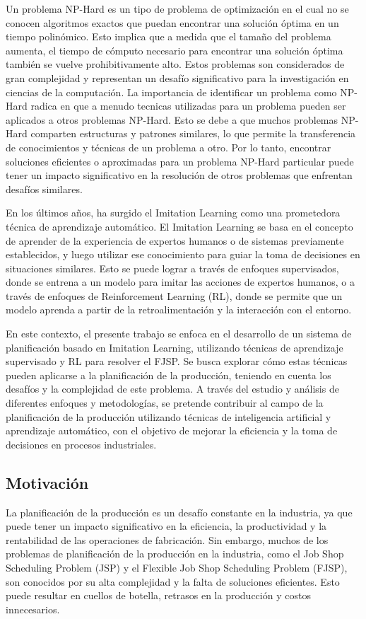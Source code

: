 Un problema NP-Hard es un tipo de problema de optimización en el cual no se conocen algoritmos 
exactos que puedan encontrar una solución óptima en un tiempo polinómico. Esto implica que a 
medida que el tamaño del problema aumenta, el tiempo de cómputo necesario para encontrar una 
solución óptima también se vuelve prohibitivamente alto. Estos problemas son considerados de 
gran complejidad y representan un desafío significativo para la investigación en ciencias de 
la computación. La importancia de identificar un problema como NP-Hard radica en que a menudo 
tecnicas utilizadas para un problema pueden ser aplicados a otros problemas NP-Hard. Esto se debe a que 
muchos problemas NP-Hard comparten estructuras y patrones similares, lo que permite la 
transferencia de conocimientos y técnicas de un problema a otro. Por lo tanto, encontrar 
soluciones eficientes o aproximadas para un problema NP-Hard particular puede tener un impacto 
significativo en la resolución de otros problemas que enfrentan desafíos similares.\medskip

En los últimos años, ha surgido el Imitation Learning como una prometedora técnica de aprendizaje 
automático. El Imitation Learning se basa en el concepto de aprender de la experiencia de expertos 
humanos o de sistemas previamente establecidos, y luego utilizar ese conocimiento para 
guiar la toma de decisiones en situaciones similares. Esto se puede lograr a través de enfoques 
supervisados, donde se entrena a un modelo para imitar las acciones de expertos humanos, o 
a través de enfoques de Reinforcement Learning (RL), donde se permite que un modelo aprenda a 
partir de la retroalimentación y la interacción con el entorno.\medskip

En este contexto, el presente trabajo se enfoca en el desarrollo de un sistema de planificación 
basado en Imitation Learning, utilizando técnicas de aprendizaje supervisado y RL para resolver el FJSP. 
Se busca explorar cómo estas técnicas pueden aplicarse a la planificación de la producción, teniendo 
en cuenta los desafíos y la complejidad de este problema. A través del estudio y análisis de 
diferentes enfoques y metodologías, se pretende contribuir al campo de la planificación de la 
producción utilizando técnicas de inteligencia artificial y aprendizaje automático, con el objetivo 
de mejorar la eficiencia y la toma de decisiones en procesos industriales.\medskip

\subsection{Motivación}
La planificación de la producción es un desafío constante en la industria, ya que puede tener 
un impacto significativo en la eficiencia, la productividad y la rentabilidad de las operaciones 
de fabricación. Sin embargo, muchos de los problemas de planificación de la producción en la 
industria, como el Job Shop Scheduling Problem (JSP) y el Flexible Job Shop Scheduling Problem (FJSP), 
son conocidos por su alta complejidad y la falta de soluciones eficientes. Esto puede resultar 
en cuellos de botella, retrasos en la producción y costos innecesarios.\medskip

